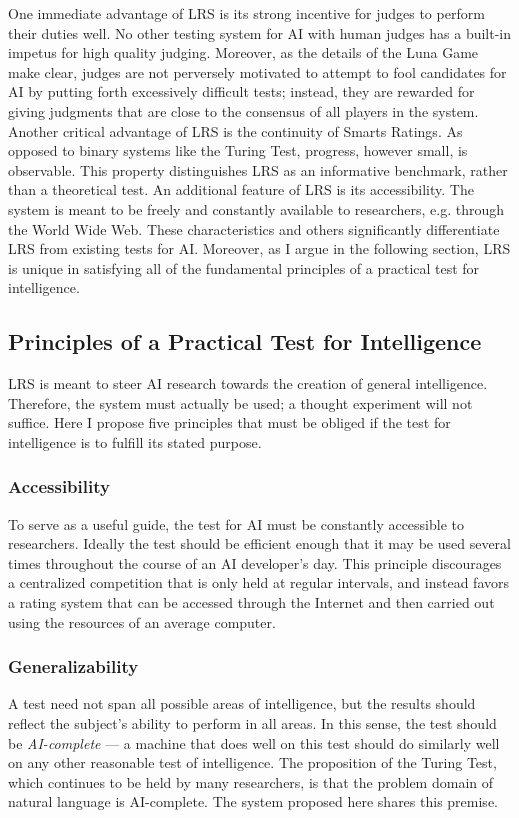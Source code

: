 One immediate advantage of LRS is its strong incentive for judges to perform their duties well. No other testing system for AI with human judges has a built-in impetus for high quality judging. Moreover, as the details of the Luna Game make clear, judges are not perversely motivated to attempt to fool candidates for AI by putting forth excessively difficult tests; instead, they are rewarded for giving judgments that are close to the consensus of all players in the system. Another critical advantage of LRS is the continuity of Smarts Ratings. As opposed to binary systems like the Turing Test, progress, however small, is observable. This property distinguishes LRS as an informative benchmark, rather than a theoretical test. An additional feature of LRS is its accessibility. The system is meant to be freely and constantly available to researchers, e.g. through the World Wide Web. These characteristics and others significantly differentiate LRS from existing tests for AI. Moreover, as I argue in the following section, LRS is unique in satisfying all of the fundamental principles of a practical test for intelligence.

\subsection{Principles of a Practical Test for Intelligence}

LRS is meant to steer AI research towards the creation of general intelligence. Therefore, the system must actually be used; a thought experiment will not suffice. Here I propose five principles that must be obliged if the test for intelligence is to fulfill its stated purpose.

\subsubsection{Accessibility}
To serve as a useful guide, the test for AI must be constantly accessible to researchers. Ideally the test should be efficient enough that it may be used several times throughout the course of an AI developer's day. This principle discourages a centralized competition that is only held at regular intervals, and instead favors a rating system that can be accessed through the Internet and then carried out using the resources of an average computer.

\subsubsection{Generalizability}
A test need not span all possible areas of intelligence, but the results should reflect the subject's ability to perform in all areas. In this sense, the test should be \textit{AI-complete} --- a machine that does well on this test should do similarly well on any other reasonable test of intelligence. The proposition of the Turing Test, which continues to be held by many researchers, is that the problem domain of natural language is AI-complete. The system proposed here shares this premise.

